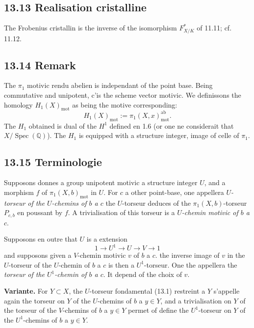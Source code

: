 \documentclass[12pt,a4paper]{article}
\theoremstyle{plain}
\theoremstyle{definition}
\theoremstyle{remark}
\DeclareMathOperator{\Spec}{Spec}
\newcommand{\bQ}{\mathbb{Q}}
\newcommand{\mot}{\mathrm{mot}}
\begin{document}
\subsection*{13.13 Realisation cristalline}

The Frobenius cristallin is the inverse of the isomorphism $F_{X/K}^*$ of 11.11; cf. 11.12.

\subsection*{13.14 Remark}

The $\pi_1$ motivic rendu abelien is independant of the point base. Being commutative and unipotent, c'is the scheme vector motivic. We definissons the homology $H_1(X)_{\mot}$ as being the motive corresponding:
\begin{equation}\label{eq:13.14.1}
H_1(X)_{\mot} := \pi_1(X,x)_{\mot}^{\mathrm{ab}}.
\end{equation}
The $H_1$ obtained is dual of the $H^1$ defined en 1.6 (or one ne considerait that $X/\Spec(\bQ)$). The $H_1$ is equipped with a structure integer, image of celle of $\pi_1$.

\subsection*{13.15 Terminologie}

Supposons donnes a group unipotent motivic a structure integer $U$, and a morphism $f$ of $\pi_1(X,b)_{\mot}$ in $U$. For $c$ a other point-base, one appellera \emph{$U$-torseur of the $U$-chemins of $b$ a $c$} the $U$-torseur deduces of the $\pi_1(X,b)$-torseur $P_{c,b}$ en poussant by $f$. A trivialisation of this torseur is a \emph{$U$-chemin motivic of $b$ a $c$}.

Supposons en outre that $U$ is a extension
\[
1 \to U^1 \to U \to V \to 1
\]
and supposons given a $V$-chemin motivic $v$ of $b$ a $c$. the inverse image of $v$ in the $U$-torseur of the $U$-chemin of $b$ a $c$ is then a $U^1$-torseur. One the appellera the \emph{torseur of the $U^1$-chemin of $b$ a $c$}. It depend of the choix of $v$.

\textbf{Variante.} For $Y \subset X$, the $U$-torseur fondamental (13.1) restreint a $Y$ s'appelle again the torseur on $Y$ of the $U$-chemins of $b$ a $y \in Y$, and a trivialisation on $Y$ of the torseur of the $V$-chemins of $b$ a $y \in Y$ permet of define the $U^1$-torseur on $Y$ of the $U^1$-chemins of $b$ a $y \in Y$.
\end{document}

